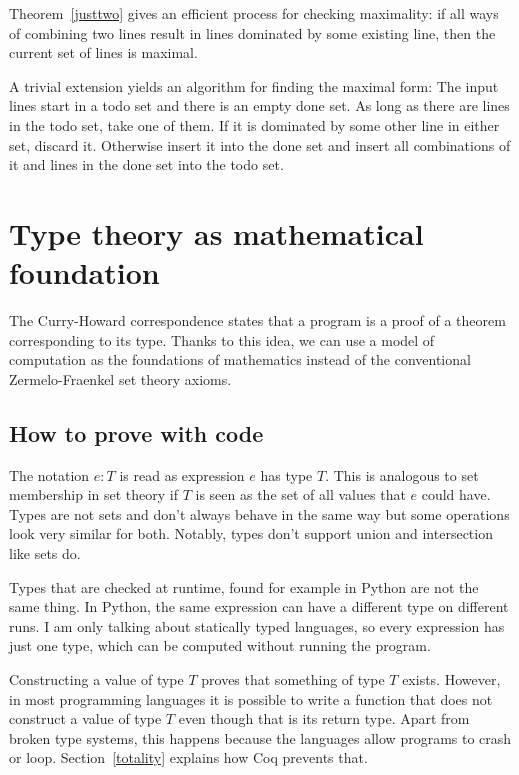 \documentclass[english, 12pt, a4paper, sci, a-1b, online]{aaltothesis}
\begin{document}
Theorem~\ref{justtwo} gives an efficient process for checking maximality: if all ways of combining two lines result in lines dominated by some existing line, then the current set of lines is maximal.

A trivial extension yields an algorithm for finding the maximal form: The input lines start in a todo set and there is an empty done set. As long as there are lines in the todo set, take one of them. If it is dominated by some other line in either set, discard it. Otherwise insert it into the done set and insert all combinations of it and lines in the done set into the todo set.


\section{Type theory as mathematical foundation}\label{dependent}

The Curry-Howard correspondence states that a program is a proof of a theorem corresponding to its type. Thanks to this idea, we can use a model of computation as the foundations of mathematics instead of the conventional Zermelo-Fraenkel set theory axioms.

\subsection{How to prove with code}

The notation $e : T$ is read as expression $e$ has type $T$. This is analogous to set membership in set theory if $T$ is seen as the set of all values that $e$ could have. Types are not sets and don't always behave in the same way but some operations look very similar for both. Notably, types don't support union and intersection like sets do.

Types that are checked at runtime, found for example in Python are not the same thing. In Python, the same expression can have a different type on different runs. I am only talking about statically typed languages, so every expression has just one type, which can be computed without running the program.

Constructing a value of type $T$ proves that something of type $T$ exists. However, in most programming languages it is possible to write a function that does not construct a value of type $T$ even though that is its return type. Apart from broken type systems, this happens because the languages allow programs to crash or loop. Section~\ref{totality} explains how Coq prevents that.
\end{document}
